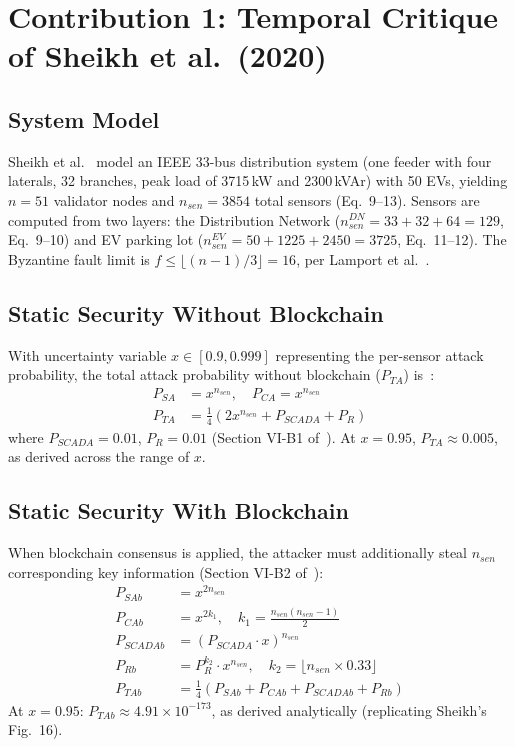 \documentclass[10pt,twocolumn,letterpaper]{article}
\begin{document}
\section{Contribution 1: Temporal Critique of Sheikh et al.\ (2020)}
\label{sec:baseline}

\subsection{System Model}

Sheikh et al.~\cite{sheikh2020} model an IEEE 33-bus distribution system (one feeder with four laterals, 32 branches, peak load of 3715\,kW and 2300\,kVAr) with 50 EVs, yielding $n = 51$ validator nodes and $n_{sen} = 3854$ total sensors (Eq.~9--13). Sensors are computed from two layers: the Distribution Network ($n_{sen}^{DN} = 33 + 32 + 64 = 129$, Eq.~9--10) and EV parking lot ($n_{sen}^{EV} = 50 + 1225 + 2450 = 3725$, Eq.~11--12). The Byzantine fault limit is $f \leq \lfloor(n-1)/3\rfloor = 16$, per Lamport et al.~\cite{lamport1982}.

\subsection{Static Security Without Blockchain}

With uncertainty variable $x \in [0.9, 0.999]$ representing the per-sensor attack probability, the total attack probability without blockchain ($P_{TA}$) is~\cite{sheikh2020}:
\begin{align}
P_{SA} &= x^{n_{sen}}, \quad P_{CA} = x^{n_{sen}} \tag{Eq.~14, 15} \\
P_{TA} &= \frac{1}{4}\left(2x^{n_{sen}} + P_{SCADA} + P_R\right) \tag{Eq.~16}
\end{align}
where $P_{SCADA} = 0.01$, $P_R = 0.01$ (Section VI-B1 of~\cite{sheikh2020}). At $x = 0.95$, $P_{TA} \approx 0.005$, as derived across the range of $x$.

\subsection{Static Security With Blockchain}

When blockchain consensus is applied, the attacker must additionally steal $n_{sen}$ corresponding key information (Section VI-B2 of~\cite{sheikh2020}):
\begin{align}
P_{SAb} &= x^{2n_{sen}} \tag{Eq.~17} \\
P_{CAb} &= x^{2k_1}, \quad k_1 = \frac{n_{sen}(n_{sen}-1)}{2} \tag{Eq.~18} \\
P_{SCADAb} &= (P_{SCADA} \cdot x)^{n_{sen}} \tag{Eq.~19} \\
P_{Rb} &= P_R^{k_2} \cdot x^{n_{sen}}, \quad k_2 = \lfloor n_{sen} \times 0.33 \rfloor \tag{Eq.~20} \\
P_{TAb} &= \frac{1}{4}\left(P_{SAb} + P_{CAb} + P_{SCADAb} + P_{Rb}\right) \tag{Eq.~21}
\end{align}
At $x = 0.95$: $P_{TAb} \approx 4.91 \times 10^{-173}$, as derived analytically (replicating Sheikh's Fig.~16).
\end{document}
